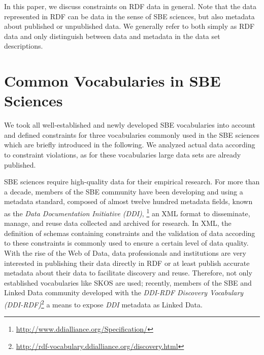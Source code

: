 \documentclass[conference]{IEEEtran}
\begin{document}
In this paper, we discuss constraints on RDF data in general. Note that the data represented in RDF can be data in the sense of SBE sciences, but also metadata about published or unpublished data. We generally refer to both simply as RDF data and only distinguish between data and metadata in the data set descriptions. 


\section{Common Vocabularies in SBE Sciences}
\label{sbe-vocabularies}

We took all well-established and newly developed SBE vocabularies into account and defined constraints for three vocabularies commonly used in the SBE sciences which are briefly introduced in the following. We analyzed actual data according to constraint violations, as for these vocabularies large data sets are already published.

SBE sciences require high-quality data for their empirical research. For more than a decade, members of the SBE community have been developing and using a
metadata standard, composed of almost twelve hundred metadata fields, known as the \emph{Data Documentation Initiative (DDI)}, \footnote{\url{http://www.ddialliance.org/Specification/}}
an XML format to disseminate, manage,
and reuse data collected and archived for research. 
In XML, the definition of schemas containing constraints and the validation of data according to these constraints is commonly used to ensure a certain level of data quality.
With the rise of the Web of Data, data professionals and institutions are very interested in publishing their data directly in RDF or at least publish accurate metadata about their data to facilitate discovery and reuse. Therefore, not only established vocabularies like SKOS are used; 
recently, members of the SBE and Linked Data community developed with the \emph{DDI-RDF Discovery Vocabulary (DDI-RDF)}\footnote{\url{http://rdf-vocabulary.ddialliance.org/discovery.html}} a means to expose \emph{DDI} metadata as Linked Data. 
\end{document}
